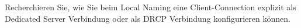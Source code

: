     \item Recherchieren Sie, wie Sie beim Local Naming eine Client-Connection explizit als Dedicated Server Verbindung oder als DRCP Verbindung konfigurieren können.
